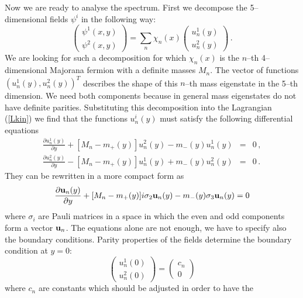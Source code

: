 \documentclass[a4paper,12pt]{article}
\def\pa{\partial}
\def\si{\sigma}
\def\bu{{\bf u}}
\begin{document}
Now we are ready to analyse the spectrum. First we decompose the 
5--dimensional fields $\psi^i$ in the following way:
\begin{equation}
\left(
\begin{array}{c}
\psi^1(x,y)
\\[6pt]
\psi^2(x,y)
\end{array}
\right)
=
\sum_n\chi_n(x)
\left(
\begin{array}{c}
u_n^1(y)
\\[6pt]
u_n^2(y)
\end{array}
\right)
\,.
\label{modes}
\end{equation}
We are looking for such a decomposition for which $\chi_n(x)$ is the
$n$--th 4--dimensional Majorana fermion with a definite masses $M_n$.
The vector of functions $(u_n^1(y),u_n^2(y))^T$ describes the shape 
of this $n$--th mass eigenstate in the 5--th dimension.   
We need both components because in
general mass eigenstates do not have definite parities. 
Substituting this decomposition
into the Lagrangian (\ref{Lkin}) we find that the functions $u_n^i(y)$
must satisfy the following differential equations
\begin{eqnarray}
\frac{\pa u_n^1(y)}{\pa y}+[M_n-m_+(y)]u_n^2(y)-m_-(y)u_n^1(y)
&\!\!\!=\!\!\!&0
\,,\label{diff1}
\\[6pt]
\frac{\pa u_n^2(y)}{\pa y}-[M_n-m_+(y)]u_n^1(y)+m_-(y)u_n^2(y)
&\!\!\!=\!\!\!&0
\,.\label{diff2}
\end{eqnarray}
They can be rewritten in a more compact form as
\begin{equation}
\frac{\pa \bu_n(y)}{\pa y}
+[M_n-m_+(y)]i\si_2\bu_n(y)-m_-(y)\si_3\bu_n(y)=0
\label{diffmatrix}
\end{equation}
where $\si_i$ are Pauli matrices in a space in which the even and odd
components form a vector $\bu_n$. 
The equations alone are not enough, we have to specify also the
boundary conditions. Parity properties of the fields determine the
boundary condition at $y=0$:
\begin{equation}
\left(\begin{array}{c}
u_n^1(0)
\\[6pt]
u_n^2(0)
\end{array}\right)
=
\left(\begin{array}{c}
c_n
\\[6pt]
0
\end{array}\right)
\label{boundcond1}
\end{equation}
where $c_n$ are constants which should be adjusted in order to have the
\end{document}
